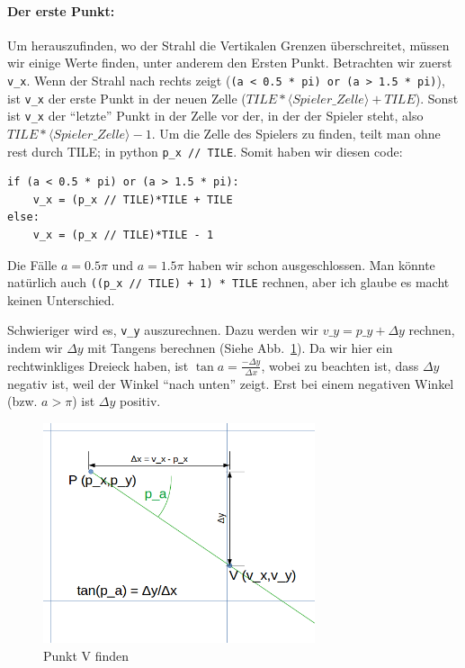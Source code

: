 \documentclass[a4paper,12pt]{report}
\begin{document}
\paragraph{Der erste Punkt:}
Um herauszufinden, wo der Strahl die Vertikalen Grenzen \"uberschreitet, m\"ussen wir einige Werte finden, unter anderem den Ersten Punkt. Betrachten wir zuerst \texttt{v\_x}. Wenn der Strahl nach rechts zeigt (\texttt{(a < 0.5 * pi) or (a > 1.5 * pi)}), ist \texttt{v\_x} der erste Punkt in der neuen Zelle ($TILE*\langle Spieler\_Zelle\rangle + TILE$). Sonst ist \texttt{v\_x} der ``letzte'' Punkt in der Zelle vor der, in der der Spieler steht, also $TILE*\langle Spieler\_Zelle\rangle - 1$. Um die Zelle des Spielers zu finden, teilt man ohne rest durch TILE; in python \texttt{p\_x // TILE}. Somit haben wir diesen code:
\begin{Verbatim}[baselinestretch=1.0, xleftmargin=1cm]
if (a < 0.5 * pi) or (a > 1.5 * pi):
	v_x = (p_x // TILE)*TILE + TILE
else:
	v_x = (p_x // TILE)*TILE - 1
\end{Verbatim}

Die F\"alle $a = 0.5\pi$ und $a = 1.5\pi$ haben wir schon ausgeschlossen. Man k\"onnte nat\"urlich auch \texttt{((p\_x // TILE) + 1) * TILE} rechnen, aber ich glaube es macht keinen Unterschied.

Schwieriger wird es, \texttt{v\_y} auszurechnen. Dazu werden wir $v\_y = p\_y + \Delta y$ rechnen, indem wir $\Delta y$ mit Tangens berechnen (Siehe Abb.~\ref{fig:vcheck1}). Da wir hier ein rechtwinkliges Dreieck haben, ist $\tan a = \frac{-\Delta y}{\Delta x}$, wobei zu beachten ist, dass $\Delta y$ negativ ist, weil der Winkel ``nach unten'' zeigt.
Erst bei einem negativen Winkel (bzw. $a > \pi$) ist $\Delta y$ positiv.

\begin{figure}[htbp] 
        \centering
        \includegraphics[width=8cm]{vcheck1.png} 
        \caption{Punkt V finden}
        \label{fig:vcheck1}
\end{figure}
\end{document}
